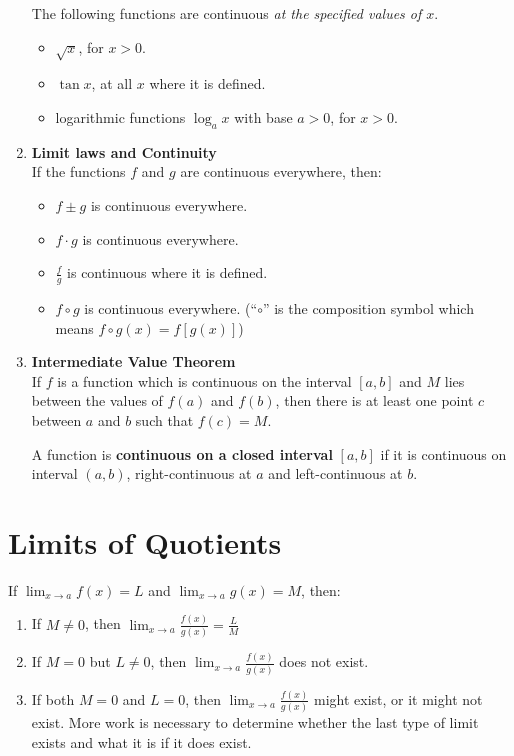 \begin{enumerate}
        The following functions are continuous \textit{at the specified values of \(x\)}.
        \begin{itemize}
            \item \(\sqrt{x}\), for \(x>0\).
            \item \(\tan x\), at all \(x\) where it is defined.
            \item logarithmic functions \(\log_a x\) with base \(a>0\), for \(x>0\).
        \end{itemize}
    \item \textbf{Limit laws and Continuity}\\
        \indent If the functions \(f\) and \(g\) are continuous everywhere, then:
        \begin{itemize}
            \item \(f\pm g\) is continuous everywhere.
            \item \(f\cdot g\) is continuous everywhere.
            \item \(\frac{f}{g}\) is continuous where it is defined.
            \item \(f\circ g\) is continuous everywhere. (``\(\circ\)'' is the composition symbol which means \(f\circ g(x)=f[g(x)]\))
        \end{itemize}
    \item \textbf{Intermediate Value Theorem}\\
        \indent If \(f\) is a function which is continuous on the interval \([a,b]\) and \(M\) lies between the values of \(f(a)\) and \(f(b)\), then there is at least one point \(c\) between \(a\) and \(b\) such that \(f(c)=M\).
        \begin{note}
            A function is \textbf{continuous on a closed interval} \([a,b]\) if it is continuous on interval \((a,b)\), right-continuous at \(a\) and left-continuous at \(b\).
        \end{note}
\end{enumerate}

\section{Limits of Quotients}
If \(\lim_{x\to a}f(x)=L\) and \(\lim_{x\to a}g(x)=M\), then:
\begin{enumerate}
    \item If \(M\neq 0\), then \(\lim_{x\to a}\frac{f(x)}{g(x)}=\frac{L}{M}\)
    \item If \(M=0\) but \(L\neq 0\), then \(\lim_{x\to a}\frac{f(x)}{g(x)}\) does not exist.
    \item If both \(M=0\) and \(L=0\), then \(\lim_{x\to a}\frac{f(x)}{g(x)}\) might exist, or it might not exist. More work is necessary to determine whether the last type of limit exists and what it is if it does exist.
\end{enumerate}

